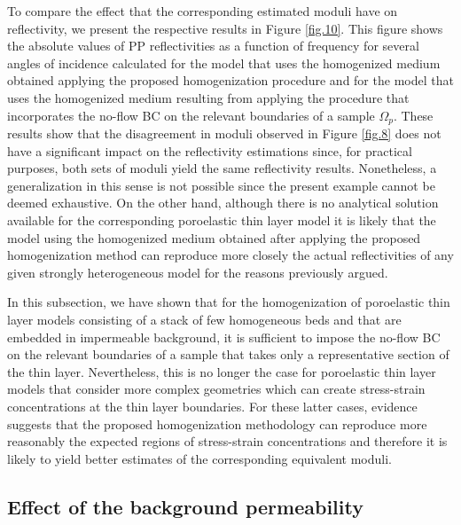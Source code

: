 \documentclass[draft]{agujournal2019}
\begin{document}
To compare the effect that the corresponding estimated moduli have on  reflectivity, we present the respective results in Figure \ref{fig.10}. This figure shows the absolute values of PP reflectivities as a function of frequency for several angles of incidence calculated for the model that uses the homogenized medium obtained applying the proposed homogenization procedure  and for the model that uses the homogenized medium resulting from applying the procedure that incorporates the no-flow BC on the relevant boundaries of a sample $\Omega_p$.  These results show that the disagreement in moduli observed in Figure \ref{fig.8} does not have a significant impact on the reflectivity estimations since, for practical purposes, both sets of moduli yield the same reflectivity results. Nonetheless, a generalization in this sense is not possible since the present example cannot be deemed exhaustive. On the other hand, although there is no analytical solution available for the corresponding poroelastic thin layer model it is likely that the model using the homogenized medium obtained after applying the proposed homogenization method can reproduce more closely the actual reflectivities of any given strongly heterogeneous model for the reasons previously argued. 

In this subsection, we have shown that for the homogenization of poroelastic thin layer models consisting of a stack of few homogeneous beds and that are embedded in impermeable background, it is sufficient to impose the no-flow BC on the relevant boundaries of a sample that takes only a representative section of the thin layer. Nevertheless, this is no longer the case for poroelastic thin layer models that consider more complex geometries which can create stress-strain concentrations at the thin layer boundaries. For these latter cases, evidence suggests that the proposed homogenization methodology can reproduce more reasonably the expected regions of  stress-strain concentrations and therefore it is likely to yield better estimates of the corresponding equivalent moduli.

\subsection{Effect of the background permeability}
\end{document}
